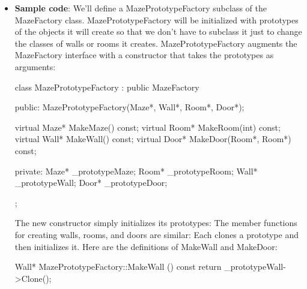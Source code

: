 \documentclass{report}
\begin{document}
\begin{itemize}
\begin{enumerate}
            \end{enumerate}
        \item \textbf{Sample code}: We'll define a MazePrototypeFactory subclass of the MazeFactory class. MazePrototypeFactory will be initialized with prototypes of the objects it will create so that we don't have to subclass it just to change the classes of walls or rooms it creates.
            \bigbreak \noindent 
            MazePrototypeFactory augments the MazeFactory interface with a constructor that takes the prototypes as arguments:
            \bigbreak \noindent 
            \begin{cppcode}
                class MazePrototypeFactory : public MazeFactory {
                public:
                    MazePrototypeFactory(Maze*, Wall*, Room*, Door*);

                    virtual Maze* MakeMaze() const;
                    virtual Room* MakeRoom(int) const;
                    virtual Wall* MakeWall() const;
                    virtual Door* MakeDoor(Room*, Room*) const;

                private:
                    Maze* _prototypeMaze;
                    Room* _prototypeRoom;
                    Wall* _prototypeWall;
                    Door* _prototypeDoor;
                };
            \end{cppcode}
            \bigbreak \noindent 
            The new constructor simply initializes its prototypes:
            \bigbreak \noindent 
            The member functions for creating walls, rooms, and doors are similar: Each clones a prototype and then initializes it. Here are the definitions of MakeWall and MakeDoor:
            \bigbreak \noindent 
            \begin{cppcode}
                Wall* MazePrototypeFactory::MakeWall () const {
                    return _prototypeWall->Clone();
                }


\end{cppcode}
\end{itemize}
\end{document}
